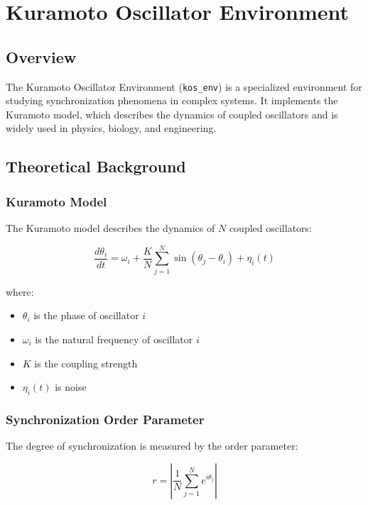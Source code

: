 \chapter{Kuramoto Oscillator Environment}

\section{Overview}

The Kuramoto Oscillator Environment (\texttt{kos\_env}) is a specialized environment for studying synchronization phenomena in complex systems. It implements the Kuramoto model, which describes the dynamics of coupled oscillators and is widely used in physics, biology, and engineering.

\section{Theoretical Background}

\subsection{Kuramoto Model}

The Kuramoto model describes the dynamics of $N$ coupled oscillators:

\begin{equation}
\frac{d\theta_i}{dt} = \omega_i + \frac{K}{N}\sum_{j=1}^{N}\sin(\theta_j - \theta_i) + \eta_i(t)
\end{equation}

where:
\begin{itemize}
    \item $\theta_i$ is the phase of oscillator $i$
    \item $\omega_i$ is the natural frequency of oscillator $i$
    \item $K$ is the coupling strength
    \item $\eta_i(t)$ is noise
\end{itemize}

\subsection{Synchronization Order Parameter}

The degree of synchronization is measured by the order parameter:

\begin{equation}
r = \left|\frac{1}{N}\sum_{j=1}^{N}e^{i\theta_j}\right|
\end{equation}

